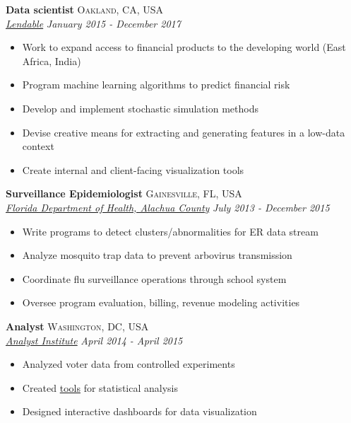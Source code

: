 \documentclass[11pt]{article}
\begin{document}
\noindent \textbf{Data scientist} \hfill \textsc{Oakland, CA, USA}\\
\noindent \emph{\href{http://lendable.io}{Lendable}} \hfill \emph{January 2015 - December 2017}
\vspace{-2mm}
\begin{itemize}\itemsep0pt \parskip0pt 
\item Work to expand access to financial products to the developing world (East Africa, India)
\item Program machine learning algorithms to predict financial risk
\item Develop and implement stochastic simulation methods 
\item Devise creative means for extracting and generating features in a low-data context 
\item Create internal and client-facing visualization tools
\end{itemize}


\noindent \textbf{Surveillance Epidemiologist} \hfill \textsc{Gainesville, FL, USA}\\
\noindent \emph{\href{http://alachua.floridahealth.gov/}{Florida Department of Health, Alachua County}} \hfill \emph{July 2013 - December 2015}
\vspace{-2mm}
\begin{itemize}\itemsep0pt \parskip0pt 
\item Write programs to detect clusters/abnormalities for ER data stream
\item Analyze mosquito trap data to prevent arbovirus transmission
\item Coordinate flu surveillance operations through school system
\item Oversee program evaluation, billing, revenue modeling activities
\end{itemize}

\noindent \textbf{Analyst} \hfill \textsc{Washington, DC, USA}\\
\noindent \emph{\href{https://analystinstitute.org/}{Analyst Institute}} \hfill \emph{April 2014 - April 2015}
\vspace{-2mm}
\begin{itemize}\itemsep0pt \parskip0pt 
\item Analyzed voter data from controlled experiments
\item Created \href{https://analystinstitute.org/power-calculator/}{tools} for statistical analysis 
\item Designed interactive dashboards for data visualization
\end{itemize}
\end{document}
